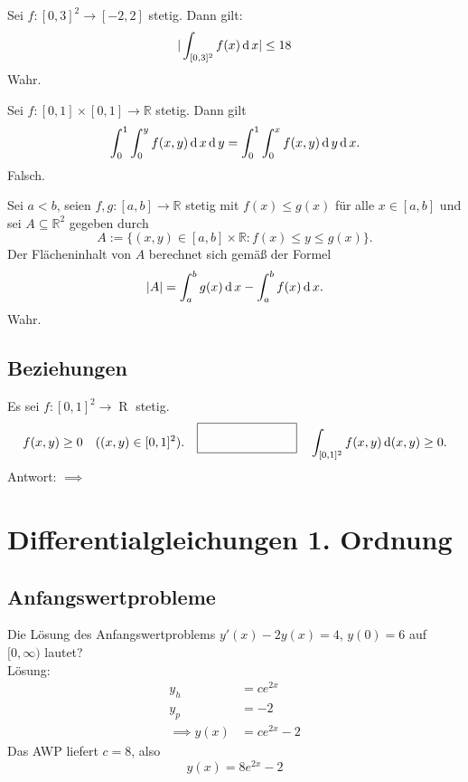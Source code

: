 \documentclass[parskip=full]{scrartcl}
\begin{document}
Sei $f : [0,3]^2 \to [-2,2]$ stetig.
Dann gilt:
\begin{displaymath}
  |\int_{[0,3]^2} f(x) \operatorname{\mathop{}\!\mathrm{d}} x | \leq 18
\end{displaymath}
Wahr.

Sei $f : [0,1] \times [0,1] \to \mathbb{R}$ stetig.
Dann gilt
\begin{displaymath}
  \int_0^1 \int_0^y f(x,y) \operatorname{\mathop{}\!\mathrm{d}} x \operatorname{\mathop{}\!\mathrm{d}} y = \int_0^1 \int_0^x f(x,y) \operatorname{\mathop{}\!\mathrm{d}} y \operatorname{\mathop{}\!\mathrm{d}} x.
\end{displaymath}
Falsch.

Sei $a < b$, seien $f,g : [a,b] \to \mathbb{R}$ stetig mit $f(x) \leq g(x)$ für alle $x \in [a,b]$ und sei $A \subseteq \mathbb{R}^2$ gegeben durch
\begin{displaymath}
  A := \{(x,y) \in [a,b] \times \mathbb{R} : f(x) \leq y \leq g(x)\}.
\end{displaymath}
Der Flächeninhalt von $A$ berechnet sich gemäß der Formel
\begin{displaymath}
  |A| = \int_a^b g(x) \operatorname{\mathop{}\!\mathrm{d}} x - \int_a^b f(x) \operatorname{\mathop{}\!\mathrm{d}} x.
\end{displaymath}
Wahr.

\subsection{Beziehungen}
Es sei $f : [0,1]^2 \to \mathop{R}$ stetig.
\begin{displaymath}
  f(x,y) \geq 0 \quad ((x,y) \in [0,1]^2).
  \quad \fbox{\rule{1in}{0pt}\rule[-0.5ex]{0pt}{4ex}} \quad
  \int_{[0,1]^2} f(x,y) \diff (x,y) \geq 0.
\end{displaymath}
Antwort: $\implies$

\section{Differentialgleichungen 1. Ordnung}
\subsection{Anfangswertprobleme}
Die Lösung des Anfangswertproblems $y'(x) - 2y(x) = 4$, $y(0) = 6$ auf $[0,\infty)$ lautet?\\
Lösung:
\begin{align*}
  y_h &= c e^{2x}\\
  y_p &= -2\\
  \implies y(x) &= ce^{2x} - 2
\end{align*}
Das AWP liefert $c = 8$, also
\begin{displaymath}
  y(x) = 8e^{2x} - 2
\end{displaymath}
\end{document}
